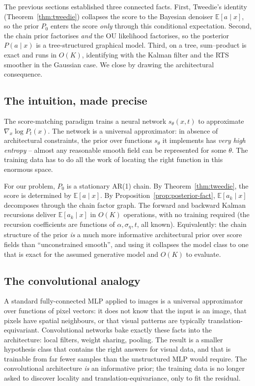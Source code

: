 \documentclass[11pt]{article}
\theoremstyle{definition}
\newcommand{\E}{\mathbb{E}}
\begin{document}
The previous sections established three connected facts. First,
Tweedie's identity (Theorem~\ref{thm:tweedie}) collapses the score to
the Bayesian denoiser \(\E[a \mid x]\), so the prior \(P_0\) enters
the score \emph{only} through this conditional expectation. Second,
the chain prior factorises \emph{and} the OU likelihood factorises,
so the posterior \(P(a \mid x)\) is a tree-structured graphical
model. Third, on a tree, sum--product is exact and runs in \(O(K)\),
identifying with the Kalman filter and the RTS smoother in the
Gaussian case. We close by drawing the architectural consequence.

\subsection{The intuition, made precise}

\begin{intuition}
The score-matching paradigm trains a neural network
\(s_\theta(x, t)\) to approximate \(\nabla_x \log P_t(x)\). The
network is a universal approximator: in absence of architectural
constraints, the prior over functions \(s_\theta\) it implements has
\emph{very high entropy} -- almost any reasonable smooth field can be
represented for some \(\theta\). The training data has to do all the
work of locating the right function in this enormous space.

For our problem, \(P_0\) is a stationary AR(1) chain. By
Theorem~\ref{thm:tweedie}, the score is determined by \(\E[a \mid x]\).
By Proposition~\ref{prop:posterior-fact}, \(\E[a_k \mid x]\) decomposes
through the chain factor graph. The forward and backward Kalman
recursions deliver \(\E[a_k \mid x]\) in \(O(K)\) operations, with no
training required (the recursion coefficients are functions of
\(\alpha, \sigma_\eta, t\), all known). Equivalently: the chain
structure of the prior \emph{is} a much more informative architectural
prior over score fields than ``unconstrained smooth'', and using it
collapses the model class to one that is exact for the assumed
generative model and \(O(K)\) to evaluate.
\end{intuition}

\subsection{The convolutional analogy}

A standard fully-connected MLP applied to images is a universal
approximator over functions of pixel vectors: it does not know that
the input is an image, that pixels have spatial neighbours, or that
visual patterns are typically translation-equivariant. Convolutional
networks bake exactly these facts into the architecture: local
filters, weight sharing, pooling. The result is a smaller hypothesis
class that contains the right answers for visual data, and that is
trainable from far fewer samples than the unstructured MLP would
require. The convolutional architecture \emph{is} an informative
prior; the training data is no longer asked to discover locality and
translation-equivariance, only to fit the residual.
\end{document}
